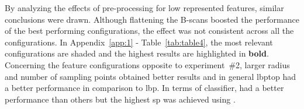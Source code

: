 

By analyzing the effects of pre-processing for low represented features, similar conclusions were drawn.
Although flattening the B-scans boosted the performance of the best performing configurations, the effect was not consistent across all the configurations.
In Appendix~\ref{app:1} - Table~\ref{tab:table4}, the most relevant configurations are shaded and the highest results are highlighted in \textbf{bold}.
Concerning the feature configurations opposite to experiment~\#2, larger radius and number of sampling points obtained better results and in general \ac{lbptop} had a better performance in comparison to \ac{lbp}.
In terms of classifier, \rf had a better performance than others but the highest \ac{sp} was achieved using \svm.


